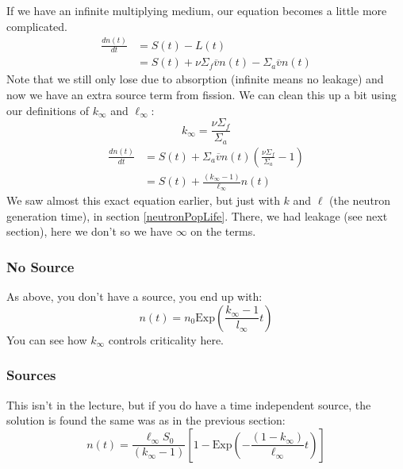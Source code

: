 \documentclass[letter]{article}
\begin{document}
\vspace{10pt}
If we have an infinite multiplying medium, our equation becomes a
little more complicated.
\begin{equation*}
  \begin{split}
        \frac{dn(t)}{dt}&=S(t)-L(t) \\
        &=S(t)+\nu\Sigma_f\overline{v}n(t)-\Sigma_a\overline{v}n(t)
  \end{split}
\end{equation*}
Note that we still only lose due to absorption (infinite means no
leakage) and now we have an extra source term from fission. We can
clean this up a bit using our definitions of $k_\infty$ and
$\ell_\infty$:
\begin{equation*}
  k_\infty=\frac{\nu\Sigma_f}{\Sigma_a}
\end{equation*}
\begin{equation*}
  \begin{split}
      \frac{dn(t)}{dt}&=S(t)+\Sigma_a\overline{v}n(t)\left(\frac{\nu\Sigma_f}{\Sigma_a}-1\right) \\
      &=S(t)+\frac{(k_\infty-1)}{\ell_\infty}n(t)
  \end{split}
\end{equation*}
We saw almost this exact equation earlier, but just with $k$ and
$\ell$ (the neutron generation time), in section
\ref{neutronPopLife}. There, we had leakage (see next section), here
we don't so we have $\infty$ on the terms.

\subsubsection{No Source}
As above, you don't have a source, you end up with:
\begin{equation*}
  n(t)=n_0\text{Exp}\left(\frac{k_\infty-1}{l_\infty}t\right)
\end{equation*}
You can see how $k_\infty$ controls criticality here.
\subsubsection{Sources}
 This isn't in
the lecture, but if you do have a time independent source, the
solution is found the same was as in the previous section:
\begin{equation*}
    n(t)=\frac{\ell_\infty S_0}{(k_\infty-1)}\left[1-\text{Exp}\left(-\frac{(1-k_\infty)}{\ell_\infty}t\right)\right]
\end{equation*}
\end{document}
